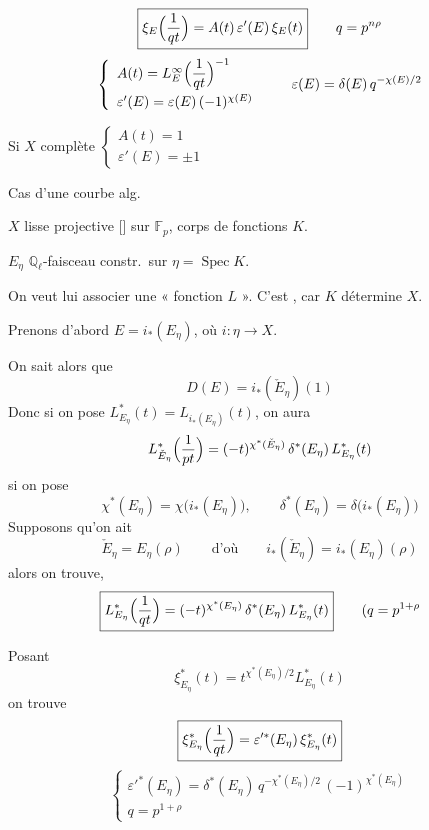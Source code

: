 \documentclass[11pt,a4paper]{article}
\begin{document}
\[
  \boxed{\xi_E\Bigl(\frac{1}{qt}\Bigr) = A(t)\, \varepsilon'(E)\, \xi_E(t)}
  \qquad q = p^{n\rho}
\]
\[
  \left\lbrace
  \begin{array}{l}
    A(t) = L^{\infty}_E\Bigl(\dfrac{1}{qt}\Bigr)^{-1} \\[8pt]
    \varepsilon'(E) = \varepsilon(E)\, (-1)^{\chi(E)}
  \end{array}
  \right.
  \qquad
  \varepsilon(E) = \delta(E)\, q^{-\chi(E)/2}
\]

Si \struck{\ill{}} $X$ complète
$\left\lbrace
\begin{array}{l}
  A(t) = 1 \\
  \varepsilon'(E) = \pm 1
\end{array}
\right.$

Cas d'une courbe alg.

$X$  lisse projective [] sur
$\mathbb{F}_p$, \struck{\ill{}} corps de fonctions $K$.

$E_\eta$ $\mathbb{Q}_\ell$-faisceau constr.\ sur $\eta = \operatorname{Spec} K$.

On veut lui associer une « fonction $L$ ». C'est ,
car $K$ détermine $X$.

Prenons d'abord $E = i_{*}(E_\eta)$, où $i : \eta \to X$.

On sait alors que
\[
  D(E) = i_{*}(\check E_\eta)(1)
\]
 Donc si on pose
$L^{*}_{E_\eta}(t) = L_{i_{*}(E_\eta)}(t)$, on aura
\[
  L^{*}_{\check E_\eta}\Bigl(\frac{1}{pt}\Bigr)
  = (-t)^{\chi^{*}(\check E_\eta)}\, \delta^{*}(E_\eta)\, L^{*}_{E_\eta}(t)
\]
si on pose
\[
  \chi^{*}(E_\eta) = \chi\bigl(i_{*}(E_\eta)\bigr) , \qquad
  \delta^{*}(E_\eta) = \delta\bigl(i_{*}(E_\eta)\bigr)
\]
Supposons qu'on ait
\[
  \check E_\eta = E_\eta(\rho) \qquad \text{d'où} \qquad
  i_{*}(\check E_\eta) = i_{*}(E_\eta)(\rho)
\]
alors on trouve,
\[
  \boxed{L^{*}_{E_\eta}\Bigl(\frac{1}{qt}\Bigr)
    = (-t)^{\chi^{*}(E_\eta)}\, \delta^{*}(E_\eta)\, L^{*}_{E_\eta}(t)}
  \qquad (q = p^{1+\rho}
\]

Posant
\[
  \xi^{*}_{E_\eta}(t) = t^{\chi^{*}(E_\eta)/2} L^{*}_{E_\eta}(t)
\]
on trouve
\[
  \boxed{\xi^{*}_{E_\eta}\Bigl(\frac{1}{qt}\Bigr)
    = \varepsilon'^{*}(E_\eta)\, \xi^{*}_{E_\eta}(t)}
\]
\[
  \left\lbrace
  \begin{array}{l}
    \varepsilon'^{*}(E_\eta) = \delta^{*}(E_\eta)\, q^{-\chi^{*}(E_\eta)/2}\, (-1)^{\chi^{*}(E_\eta)} \\[6pt]
    q = p^{1+\rho}
  \end{array}
  \right.
\]
\end{document}
